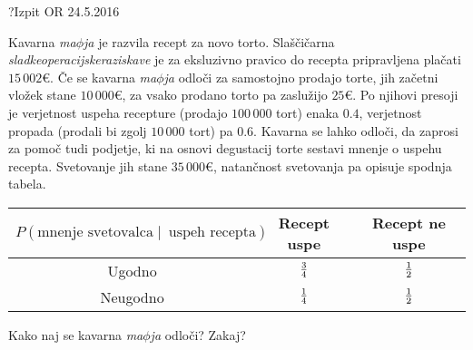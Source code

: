 \begin{naloga}{?}{Izpit OR 24.5.2016}
\begin{vprasanje}
Kavarna {\em ma$\phi$ja} je razvila recept za novo torto.
Slaščičarna {\em sladkeoperacijskeraziskave}
je za eksluzivno pravico do recepta pripravljena plačati $15\,002 €$.
Če se kavarna {\em ma$\phi$ja} odloči za samostojno prodajo torte,
jih začetni vložek stane $10\,000 €$,
za vsako prodano torto pa zaslužijo $25 €$.
Po njihovi presoji
je verjetnost uspeha recepture (prodajo $100\,000$ tort) enaka $0.4$,
verjetnost propada (prodali bi zgolj $10\,000$ tort) pa $0.6$.
Kavarna se lahko odloči, da zaprosi za pomoč tudi pod\-jet\-je,
ki na osnovi degustacij torte sestavi mnenje o uspehu recepta.
Svetovanje jih stane $35\,000 €$,
natančnost svetovanja pa opisuje spodnja tabela.
\begin{center}
\begin{tabular}{c|cc}
$P(\text{mnenje svetovalca} \;|\;\ \text{uspeh recepta})$
& Recept uspe & Recept ne uspe \\ \hline
Ugodno   & ${3 \over 4}$ & ${1 \over 2}$ \\
Neugodno & ${1 \over 4}$ & ${1 \over 2}$
\end{tabular}
\end{center}
Kako naj se kavarna {\em ma$\phi$ja} odloči?
Zakaj?
\end{vprasanje}
\begin{odgovor}
\end{odgovor}
\end{naloga}
